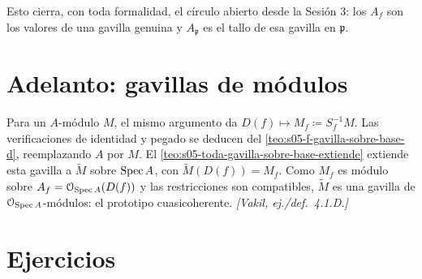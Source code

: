\begin{obs}
\label{obs:s05-esto-cierra-toda-formalidad-circulo}
Esto cierra, con toda formalidad, el círculo abierto desde la Sesión 3: los $A_f$ son los valores de una gavilla genuina y $A_{\mathfrak p}$ es el tallo de esa gavilla en $\mathfrak p$.
\end{obs}

\section{Adelanto: gavillas de módulos}

Para un $A$-módulo $M$, el mismo argumento da $D(f)\mapsto M_f\coloneqq S_f^{-1}M$. Las verificaciones de identidad y pegado se deducen del \cref{teo:s05-f-gavilla-sobre-base-d}, reemplazando $A$ por $M$. El \cref{teo:s05-toda-gavilla-sobre-base-extiende} extiende esta gavilla a $\widetilde M$ sobre $\operatorname{Spec} A$, con $\widetilde M(D(f))=M_f$. Como $M_f$ es módulo sobre $A_f=\mathcal O_{\operatorname{Spec} A}(D(f))$ y las restricciones son compatibles, $\widetilde M$ es una gavilla de $\mathcal O_{\operatorname{Spec} A}$-módulos: el prototipo cuasicoherente. \emph{[Vakil, ej./def.~4.1.D.]}

\section{Ejercicios}

